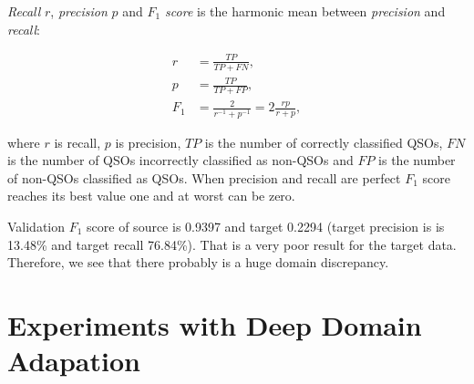 \textit{Recall} \(r\), \textit{precision} \(p\)
and \textit{\(F_1\) score} is the harmonic mean between \textit{precision} and \textit{recall}:

\begin{align}
	r &= \frac{\mathit{TP}}{\mathit{TP} + \mathit{FN}}, \\
	p &= \frac{\mathit{TP}}{\mathit{TP} + \mathit{FP}}, \\
	F_1 &= \frac{2}{r^{-1} + p^{-1}} = 2 \frac{r p}{r + p},
\end{align}

where \(r\) is recall, \(p\) is precision,
\(\mathit{TP}\) is the number of correctly classified QSOs,
\(\mathit{FN}\) is the number of QSOs incorrectly classified as non-QSOs
and \(\mathit{FP}\) is the number of non-QSOs classified as QSOs.
When precision and recall are perfect
\(F_1\) score reaches its best value one and at worst can be zero.

Validation \(F_1\) score of source is 0.9397 and target 0.2294
(target precision is is 13.48\% and target recall 76.84\%).
That is a very poor result for the target data.
Therefore, we see that there probably is a huge domain discrepancy.

\begin{table}
\begin{center}
\end{center}
\end{table}

\section{Experiments with Deep Domain Adapation}

